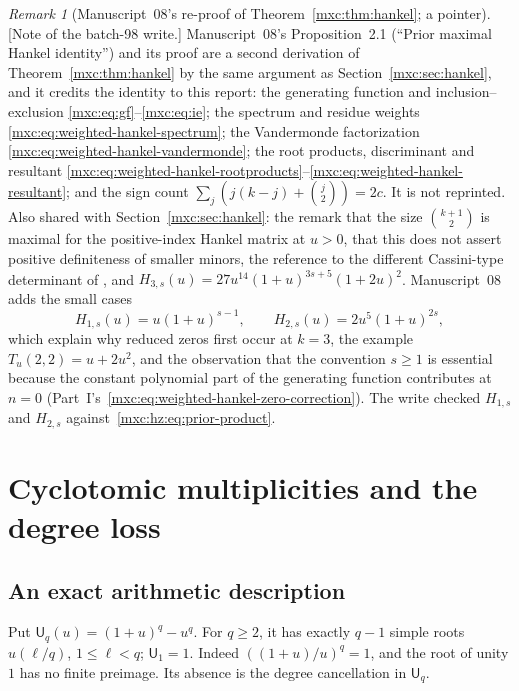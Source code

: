 \documentclass[11pt]{article}
\numberwithin{equation}{section}
\theoremstyle{definition}
\theoremstyle{remark}
\newtheorem{remark}[theorem]{Remark}
\begin{document}
\begin{remark}[Manuscript~08's re-proof of Theorem~\ref{mxc:thm:hankel}; a pointer]\label{mxc:hz:rem:reproof}
[Note of the batch-98 write.] Manuscript~08's Proposition~2.1 (``Prior
maximal Hankel identity'') and its proof are a second derivation of
Theorem~\ref{mxc:thm:hankel} by the same argument as
Section~\ref{mxc:sec:hankel}, and it credits the identity to this report:
the generating function and inclusion--exclusion
\eqref{mxc:eq:gf}--\eqref{mxc:eq:ie}; the spectrum and residue weights
\eqref{mxc:eq:weighted-hankel-spectrum}; the Vandermonde factorization
\eqref{mxc:eq:weighted-hankel-vandermonde}; the root products,
discriminant and resultant
\eqref{mxc:eq:weighted-hankel-rootproducts}--\eqref{mxc:eq:weighted-hankel-resultant};
and the sign count $\sum_j(j(k-j)+\binom j2)=2c$. It is not reprinted.
Also shared with Section~\ref{mxc:sec:hankel}: the remark that the size
$\binom{k+1}2$ is maximal for the positive-index Hankel matrix at $u>0$,
that this does not assert positive definiteness of smaller minors, the
reference to the different Cassini-type determinant of
\cite[Proposition~21]{mpr2009}, and $H_{3,s}(u)=27u^{14}(1+u)^{3s+5}(1+2u)^2$.
Manuscript~08 adds the small cases
\[
 H_{1,s}(u)=u(1+u)^{s-1},\qquad
 H_{2,s}(u)=2u^5(1+u)^{2s},
\]
which explain why reduced zeros first occur at $k=3$, the example
$T_u(2,2)=u+2u^2$, and the observation that the convention $s\ge1$ is
essential because the constant polynomial part of the generating function
contributes at $n=0$ (Part~I's~\eqref{mxc:eq:weighted-hankel-zero-correction}).
The write checked $H_{1,s}$ and $H_{2,s}$ against~\eqref{mxc:hz:eq:prior-product}.
\end{remark}

\section{Cyclotomic multiplicities and the degree loss}\label{mxc:hz:sec:arithmetic}

\subsection{An exact arithmetic description}

Put $\mathsf U_q(u)=(1+u)^q-u^q$. For $q\ge2$, it has exactly $q-1$ simple
roots $u(\ell/q)$, $1\le\ell<q$; $\mathsf U_1=1$. Indeed
$((1+u)/u)^q=1$, and the root of unity $1$ has no finite preimage. Its
absence is the degree cancellation in $\mathsf U_q$.
\end{document}
